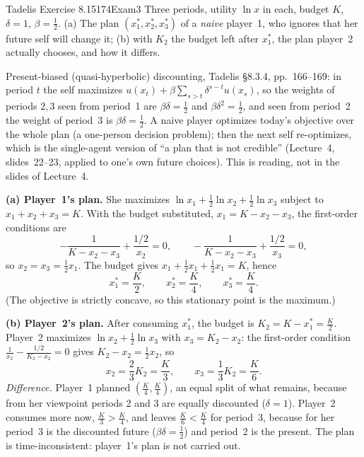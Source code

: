 \begin{exsol}{Tadelis Exercise 8.15}{174}{Exam}{3}
\asked Three periods, utility $\ln x$ in each, budget $K$, $\delta = 1$, $\beta = \frac12$. (a) The plan
$(x_1^*, x_2^*, x_3^*)$ of a \emph{naive} player~1, who ignores that her future self will change it; (b) with $K_2$
the budget left after $x_1^*$, the plan player~2 actually chooses, and how it differs.

\method Present-biased (quasi-hyperbolic) discounting, Tadelis \S8.3.4, pp.~166--169: in period $t$ the self
maximizes $u(x_t) + \beta\sum_{s>t}\delta^{s-t}u(x_s)$, so the weights of periods $2, 3$ seen from period~1 are
$\beta\delta = \frac12$ and $\beta\delta^2 = \frac12$, and seen from period~2 the weight of period~3 is
$\beta\delta = \frac12$. A naive player optimizes today's objective over the whole plan (a one-person decision
problem); then the next self re-optimizes, which is the single-agent version of ``a plan that is not credible''
(Lecture~4, slides~22--23, applied to one's own future choices). This is reading, not in the slides of Lecture~4.

\solution
\textbf{(a) Player~1's plan.} She maximizes $\ln x_1 + \frac12\ln x_2 + \frac12\ln x_3$ subject to
$x_1 + x_2 + x_3 = K$. With the budget substituted, $x_1 = K - x_2 - x_3$, the first-order conditions are
\[
  -\frac{1}{K - x_2 - x_3} + \frac{1/2}{x_2} = 0, \qquad -\frac{1}{K - x_2 - x_3} + \frac{1/2}{x_3} = 0 ,
\]
so $x_2 = x_3 = \frac12 x_1$. The budget gives $x_1 + \frac12 x_1 + \frac12 x_1 = K$, hence
\[
  x_1^* = \frac{K}{2}, \qquad x_2^* = \frac{K}{4}, \qquad x_3^* = \frac{K}{4}.
\]
(The objective is strictly concave, so this stationary point is the maximum.)

\textbf{(b) Player~2's plan.} After consuming $x_1^*$, the budget is $K_2 = K - x_1^* = \frac{K}{2}$. Player~2
maximizes $\ln x_2 + \frac12\ln x_3$ with $x_3 = K_2 - x_2$: the first-order condition
$\frac{1}{x_2} - \frac{1/2}{K_2 - x_2} = 0$ gives $K_2 - x_2 = \frac12 x_2$, so
\[
  x_2 = \frac23 K_2 = \frac{K}{3}, \qquad x_3 = \frac13 K_2 = \frac{K}{6}.
\]
\emph{Difference.} Player~1 planned $(\frac{K}{4}, \frac{K}{4})$, an equal split of what remains, because from
her viewpoint periods 2 and 3 are equally discounted ($\delta = 1$). Player~2 consumes more now,
$\frac K3 > \frac K4$, and leaves $\frac K6 < \frac K4$ for period~3, because for her period~3 is the
discounted future ($\beta\delta = \frac12$) and period~2 is the present. The plan is time-inconsistent:
player~1's plan is not carried out.


\end{exsol}
